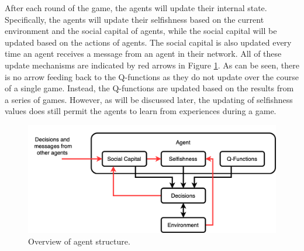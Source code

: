 After each round of the game, the agents will update their internal state. Specifically, the agents will update their selfishness based on the current environment and the social capital of agents, while the social capital will be updated based on the actions of agents. The social capital is also updated every time an agent receives a message from an agent in their network. All of these update mechanisms are indicated by red arrows in Figure \ref{fig:agent_structure}. As can be seen, there is no arrow feeding back to the Q-functions as they do not update over the course of a single game. Instead, the Q-functions are updated based on the results from a series of games. However, as will be discussed later, the updating of selfishness values does still permit the agents to learn from experiences during a game.


\begin{figure}[!ht]
    \centering
    \includegraphics[width=0.75\linewidth]{004_team_1_agent_design/images/agent_structure.png}
    \caption{Overview of agent structure.}
    \label{fig:agent_structure}
\end{figure}

